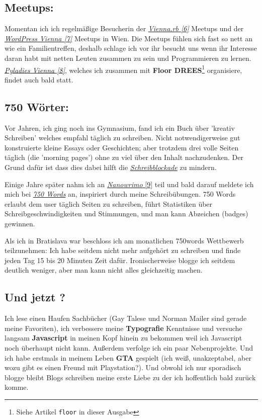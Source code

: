 \documentclass[10pt,a4paper,ngerman,twoside]{article} %
\begin{document}
\subsection*{Meetups:}

Momentan ich ich regelmäßige Besucherin der \href{http://vienna.rb}{\textit{Vienna.rb [6]}} Meetups und der \href{http://wpvienna.com/}{\textit{WordPress Vienna [7]}} Meetups in Wien. Die Meetups fühlen sich fast so nett an wie ein Familientreffen, deshalb schlage ich vor ihr besucht uns wenn ihr Interesse daran habt mit netten Leuten zusammen zu sein und Programmieren zu lernen. \href{http://meetup.com/pyladies-vienna}{\textit{Pyladies Vienna [8]}}, welches ich zusammen mit \textbf{Floor DREES}\footnote{Siehe Artikel \texttt{floor} in dieser Ausgabe} organisiere, findet auch bald statt. 

\subsection*{750 Wörter:}

Vor Jahren, ich ging noch ins Gymnasium, fand ich ein Buch über 'kreativ Schreiben' welches empfahl täglich zu schreiben. Nicht notwendigerweise gut konstruierte kleine Essays oder Geschichten; aber trotzdem drei volle Seiten täglich (die 'morning pages') ohne zu viel über den Inhalt nachzudenken. Der Grund dafür ist dass dies dabei hilft die \href{https://de.wikipedia.org/wiki/Schreibblockade}{\textit{Schreibblockade}} zu mindern. 

Einige Jahre später nahm ich an \href{http://nanowrimo.org/}{\textit{Nanowrimo} [9]} teil und bald darauf meldete ich mich bei \href{https://750words.com/}{\textit{750 Words}} an, inspiriert durch meine Schreibübungen. 750 Words erlaubt dem user täglich Seiten zu schreiben, führt Statistiken über Schreibgeschwindigkeiten und Stimmungen, und man kann Abzeichen (badges) gewinnen. 

Als ich in Bratislava war beschloss ich am monatlichen 750words Wettbewerb teilzunehmen: Ich habe seitdem nicht mehr aufgehört zu schreiben und finde jeden Tag 15 bis 20 Minuten Zeit dafür. Ironischerweise blogge ich seitdem deutlich weniger, aber man kann nicht alles gleichzeitig machen. 

\subsection*{Und jetzt ?}

Ich lese einen Haufen Sachbücher (Gay Talese und Norman Mailer sind gerade meine Favoriten), ich verbessere meine \textbf{Typografie} Kenntnisse und versuche langsam \textbf{Javascript} in meinen Kopf hinein zu bekommen weil ich Javascript noch überhaupt nicht kann. Außerdem verfolge ich ein paar Nebenprojekte. Und ich habe erstmals in meinem Leben \textbf{GTA} gespielt (ich weiß, unakzeptabel, aber wozu gibt es einen Freund mit Playstation?). Und obwohl ich nur sporadisch blogge bleibt Blogs schreiben meine erste Liebe zu der ich hoffentlich bald zurück komme. 
\end{document}
